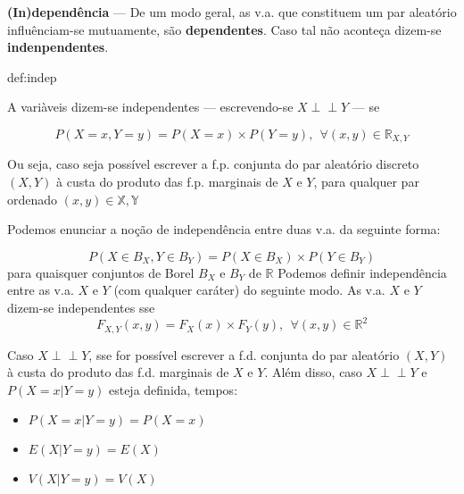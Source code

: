 \noindent \textbf{(In)dependência} --- De um modo geral, as v.a. que constituem um par aleatório influênciam-se mutuamente, são \textbf{dependentes}. Caso tal não aconteça dizem-se \textbf{indenpendentes}.

\begin{theo}{def:indep}\label{def:indep}

    \noindent A variàveis dizem-se independentes --- escrevendo-se $X\perp \!\!\! \perp Y$ --- se

    $$
        P(X = x, Y = y) = P(X = x) \times P(Y = y),\,\; \forall (x,y) \in \mathbb{R}_{X,Y}
    $$

    \noindent Ou seja, caso seja possível escrever a f.p. conjunta do par aleatório discreto $(X,Y)$ à custa do produto das f.p. marginais de $X$ e $Y$, para qualquer par ordenado $(x,y) \in \mathbb{X,Y}$
\end{theo}
\noindent Podemos enunciar a noção de independência entre duas v.a. da seguinte forma:

$$
    P(X \in B_X, Y \in B_Y) = P(X \in B_X) \times P(Y \in B_Y)
$$
\noindent para quaisquer conjuntos de Borel $B_X$ e $B_Y$ de $\mathbb{R}$
\noindent Podemos definir independência entre as v.a. $X$ e $Y$ (com qualquer caráter) do seguinte modo. As v.a. $X$ e $Y$ dizem-se independentes sse
$$
    F_{X,Y}(x,y) = F_X(x) \times F_Y(y),\,\; \forall (x,y) \in \mathbb{R}^2
$$

\noindent Caso  $X\perp \!\!\! \perp Y$, sse for possível escrever a f.d. conjunta do par aleatório $(X,Y)$ à custa do produto das f.d. marginais de $X$ e $Y$. Além disso, caso $X\perp \!\!\! \perp Y$ e $P(X = x | Y = y)$ esteja definida, tempos:

\begin{itemize}
    \item $P(X = x | Y = y) = P(X = x)$
    \item $E(X | Y = y) = E(X)$
    \item $V(X | Y = y) = V(X)$
\end{itemize}

